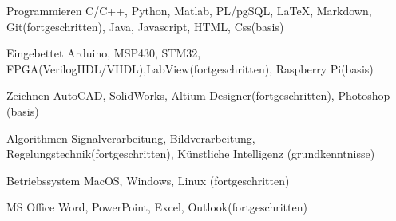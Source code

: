 

\begin{cvskills}

  \cvskill
    {Programmieren} %
    {C/C++, Python, Matlab, PL/pgSQL, \LaTeX, Markdown, Git(fortgeschritten), Java, Javascript, HTML, Css(basis)} %

  \cvskill
    {Eingebettet} %
    {Arduino, MSP430, STM32,  FPGA(VerilogHDL/VHDL),LabView(fortgeschritten), Raspberry Pi(basis)} %

  \cvskill
    {Zeichnen} %
    {AutoCAD, SolidWorks, Altium Designer(fortgeschritten), Photoshop (basis)} %

  \cvskill
    {Algorithmen} %
    {Signalverarbeitung, Bildverarbeitung, Regelungstechnik(fortgeschritten), Künstliche Intelligenz (grundkenntnisse)} %

  \cvskill
	{Betriebssystem} %
	{MacOS, Windows, Linux (fortgeschritten)} %

  \cvskill
	{MS Office} %
	{Word, PowerPoint, Excel, Outlook(fortgeschritten)} %


\end{cvskills}
